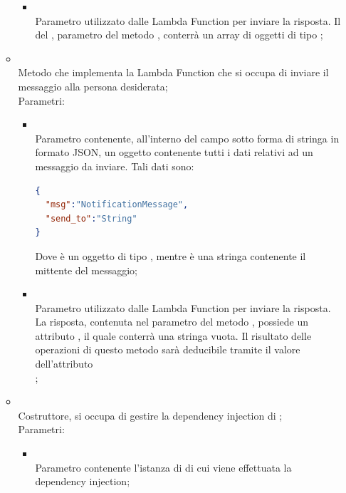 \begin{itemize}
\begin{itemize}
\begin{itemize}
			\item {} \\
			Parametro utilizzato dalle Lambda Function per inviare la risposta. Il  del , parametro del metodo , conterrà un array di oggetti di tipo ;
		\end{itemize}
		\item[]  \\		Metodo che implementa la Lambda Function che si occupa di inviare il messaggio alla persona desiderata;\\
		Parametri:
		\begin{itemize}
			\item {} \\
			Parametro contenente, all'interno del campo  sotto forma di stringa in formato JSON, un oggetto contenente tutti i dati relativi ad un messaggio da inviare.
			Tali dati sono:
\begin{lstlisting}[language=json,firstnumber=1]
{
  "msg":"NotificationMessage",
  "send_to":"String"
}
\end{lstlisting}
			Dove  è un oggetto di tipo , mentre  è una stringa contenente il mittente del messaggio;
			\item {} \\
			Parametro utilizzato dalle Lambda Function per inviare la risposta. La risposta, contenuta nel  parametro del metodo , possiede un attributo , il quale conterrà una stringa vuota. Il risultato delle operazioni di questo metodo sarà deducibile tramite il valore dell'attributo \\ ;
		\end{itemize}
		\item[]  \\		Costruttore, si occupa di gestire la dependency injection di ;\\
		Parametri:
		\begin{itemize}
			\item {} \\
			Parametro contenente l'istanza di  di cui viene effettuata la dependency injection;

\end{itemize}
\end{itemize}
\end{itemize}
